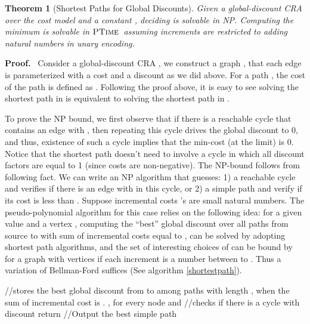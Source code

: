 \documentclass[11pt]{article}
\newtheorem{theorem}{Theorem}
\def\Proof{{\bf Proof.}}
\def\qed{{\bf }}
\def\qed{{\bf }}
\newcommand{\ptime}{\ensuremath{\sc\textsc{PTime}}\xspace}
\newcommand{\np}{{\sc\textsc NP}\xspace}
\begin{document}
\begin{theorem}[Shortest Paths for Global Discounts]
Given a global-discount CRA  over the cost model
 and a constant , deciding
 is solvable in \np.
Computing the minimum is solvable in \ptime\ assuming increments are
restricted to adding natural numbers in unary encoding.
\end{theorem}
\Proof~
Consider a global-discount CRA 
, we construct a graph , that each edge  is parameterized with a cost  and a discount  as we did above.
For a path ,
the cost of the path is defined as   .
Following the proof above, it is easy to see solving the shortest path in  is equivalent to solving the shortest path in .

To prove the \np bound, we first observe that if there is a reachable cycle that
contains an edge  with , then repeating this cycle
drives the global discount to 0, and thus, existence of such a cycle implies
that the min-cost (at the limit) is 0.
Notice that the shortest path doesn't need to involve a cycle
in which all discount factors are equal to 1 (since costs are non-negative).
The \np-bound follows from following fact. We can write an \np algorithm that guesses: 1) a reachable cycle and verifies if there is an edge  with  in this cycle, or 2) a simple path and verify if its cost is less than .
Suppose incremental costs 's are small natural numbers.
The pseudo-polynomial algorithm for this case relies on the following idea: for a given value  and a vertex ,
computing the ``best'' global discount over all paths from source to  with
sum of incremental costs equal to , can be solved by adopting shortest path algorithms, and
the set of interesting choices of  can be bound by  for a graph with  vertices if
each increment is a number between  to . Thus a variation of Bellman-Ford suffices (See algorithm \ref{shortestpath}).
\begin{algorithm}
\caption{Shortest Path Algorithm on Global Discount CRA }
\label{shortestpath}
\begin{algorithmic}
    \STATE \slash \slash  stores the best global discount from  to  among paths with length , when the sum of incremental cost is .
    \STATE , for every node  and 
    \STATE 
            \STATE 
        \ENDFOR
    \ENDFOR
    \STATE \slash \slash checks if there is a cycle with discount 
        \STATE return 
    \ENDIF
    \STATE \slash \slash Output the best simple path
    \RETURN 
\end{algorithmic}
\end{algorithm}
\qed
\end{document}
